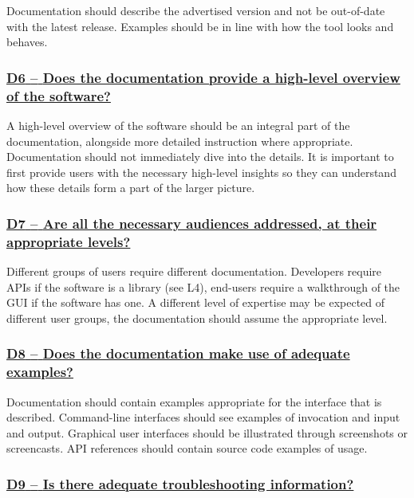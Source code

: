\documentclass[a4paper,11pt]{article}
\newcommand{\indicator}[1]{\subsubsection*{\underline{#1}}}
\begin{document}
Documentation should describe the advertised version and not be out-of-date
with the latest release. Examples should be in line with how the tool looks and
behaves.

\newcommand{\dSixName}{D6}
\newcommand{\dSixID}{\dSixName}
\newcommand{\dSixText}{Does the documentation provide a high-level overview of the software?}
\indicator{\dSixName{ }--{ }\dSixText}\label{id:d6}

A high-level overview of the software should be an integral part of the
documentation, alongside more detailed instruction where appropriate.
Documentation should not immediately dive into the details. It is important to
first provide users with the necessary high-level insights so they can understand how
these details form a part of the larger picture.


\newcommand{\dSevenName}{D7}
\newcommand{\dSevenID}{\dSevenName}
\newcommand{\dSevenText}{Are all the necessary audiences addressed, at their appropriate levels?}
\indicator{\dSevenName{ }--{ }\dSevenText}\label{id:d7}

Different groups of users require different documentation. Developers require
APIs if the software is a library (see L4), end-users require a walkthrough of the GUI
if the software has one. A different level of expertise may be expected of
different user groups, the documentation should assume the appropriate level.

\newcommand{\dEightName}{D8}
\newcommand{\dEightID}{\dEightName}
\newcommand{\dEightText}{Does the documentation make use of adequate examples?}
\indicator{\dEightName{ }--{ }\dEightText}\label{id:d8}

Documentation should contain examples appropriate for the interface that is
described. Command-line interfaces should see examples of invocation and input
and output. Graphical user interfaces should be illustrated through screenshots or
screencasts. API references should contain source code examples of usage.

\newcommand{\dNineName}{D9}
\newcommand{\dNineID}{\dNineName}
\newcommand{\dNineText}{Is there adequate troubleshooting information?}
\indicator{\dNineName{ }--{ }\dNineText}\label{id:d9}
\end{document}
